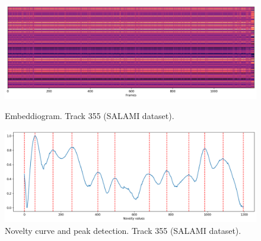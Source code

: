 \begin{figure}[ht]
  \centering
  \begin{minipage}[b]{1.0\linewidth}
    \centering
    \includegraphics[width=\linewidth]{figures/images/355embeddiogramnormalized.png}
    \caption[Embeddiogram. Track 355 (SALAMI dataset).]{Embeddiogram. Track 355 (SALAMI dataset).}
    \label{fig:embeddiogram}
  \end{minipage}

  \begin{minipage}[b]{1.0\linewidth}
    \centering
    \includegraphics[width=\linewidth]{figures/images/355novelty.png}
    \caption[Novelty curve + peaks. Track 355 (SALAMI dataset).]{Novelty curve and peak detection. Track 355 (SALAMI dataset).}
    \label{fig:novelty}
  \end{minipage}
\end{figure}

